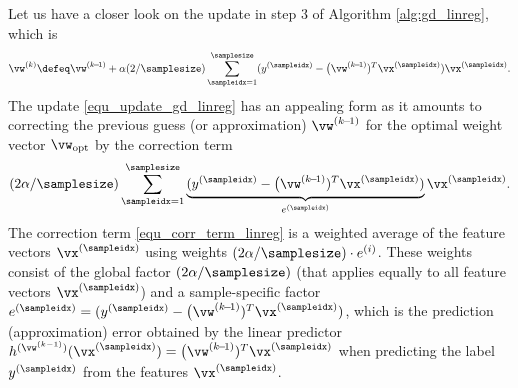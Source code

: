 \documentclass[12pt]{report}
\begin{document}
Let us have a closer look on the update in step $3$ of Algorithm \ref{alg:gd_linreg}, which is 
\begin{equation}
\label{equ_update_gd_linreg}
\vw^{(k)} \defeq \vw^{(k\!-\!1)} + \alpha (2/\samplesize) \sum_{\sampleidx=1}^{\samplesize} (y^{(\sampleidx)} - \big(\vw^{(k\!-\!1)})^{T} \vx^{(\sampleidx)})\vx^{(\sampleidx)}. 
\end{equation}
The update \eqref{equ_update_gd_linreg} has an appealing form as it amounts to correcting the previous guess (or approximation) $\vw^{(k\!-\!1)}$ for 
the optimal weight vector $\vw_{\rm opt}$ by the correction term 
\begin{equation}
\label{equ_corr_term_linreg}
 (2\alpha/\samplesize) \sum_{\sampleidx=1}^{\samplesize} \underbrace{(y^{(\sampleidx)} - \big(\vw^{(k\!-\!1)})^{T} \vx^{(\sampleidx)})}_{e^{(\sampleidx)}} \vx^{(\sampleidx)}. 
\end{equation}
The correction term \eqref{equ_corr_term_linreg} is a weighted average of the feature vectors $\vx^{(\sampleidx)}$ using weights $(2\alpha/\samplesize) \cdot e^{(i)}$. 
These weights consist of the global factor $(2\alpha/\samplesize)$ (that applies equally to all feature vectors $\vx^{(\sampleidx)}$) and a sample-specific factor 
$e^{(\sampleidx)} = (y^{(\sampleidx)} - \big(\vw^{(k\!-\!1)})^{T} \vx^{(\sampleidx)})$, which is the prediction (approximation) error obtained by the linear predictor 
$h^{(\vw^{(k-1)})}(\vx^{(\sampleidx)}) =   \big(\vw^{(k\!-\!1)})^{T} \vx^{(\sampleidx)}$ when predicting the label $y^{(\sampleidx)}$ from the features $\vx^{(\sampleidx)}$. 

\begin{center}
\end{center}

\end{document}
